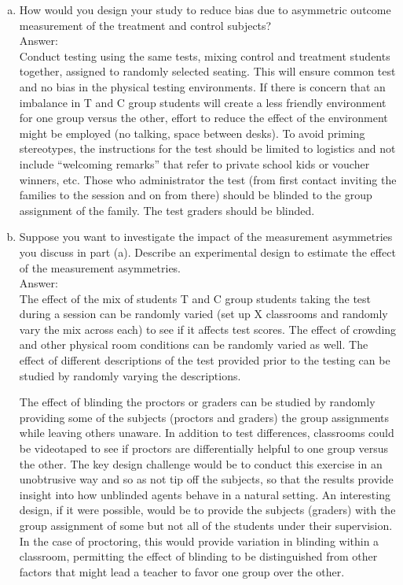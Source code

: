 \documentclass[11pt,notitlepage]{article}\usepackage[]{graphicx}\usepackage[]{color}
\begin{document}
\begin{enumerate}[a)]
\item How would you design your study to reduce bias due to asymmetric outcome measurement of the treatment and control subjects?\\
Answer:\\
Conduct testing using the same tests, mixing control and treatment students together, assigned to randomly selected seating. This will ensure common test and no bias in the physical testing environments. If there is concern that an imbalance in T and C group students will create a less friendly environment for one group versus the other, effort to reduce the effect of the environment might be employed (no talking, space between desks). To avoid priming stereotypes, the instructions for the test should be limited to logistics and not include ``welcoming remarks'' that refer to private school kids or voucher winners, etc. Those who administrator the test (from first contact inviting the families to the session and on from there) should be blinded to the group assignment of the family. The test graders should be blinded.  
\item Suppose you want to investigate the impact of the measurement asymmetries you discuss in part (a). Describe an experimental design to estimate the effect of the measurement asymmetries.\\
Answer:\\
The effect of the mix of students T and C group students taking the test during a session can be randomly varied (set up X classrooms and randomly vary the mix across each) to see if it affects test scores. The effect of crowding and other physical room conditions can be randomly varied as well.  The effect of different descriptions of the test provided prior to the testing can be studied by randomly varying the descriptions. 

The effect of blinding the proctors or graders can be studied by randomly providing some of the subjects (proctors and graders) the group assignments while leaving others unaware. In addition to test differences, classrooms could be videotaped to see if proctors are differentially helpful to one group versus the other. The key design challenge would be to conduct this exercise in an unobtrusive way and so as not tip off the subjects, so that the results provide insight into how unblinded agents behave in a natural setting. An interesting design, if it were possible, would be to provide the subjects (graders) with the group assignment of some but not all of the students under their supervision. In the case of proctoring, this would provide variation in blinding within a classroom, permitting the effect of blinding to be distinguished from other factors that might lead a teacher to favor one group over the other. 

\end{enumerate}
\end{document}
